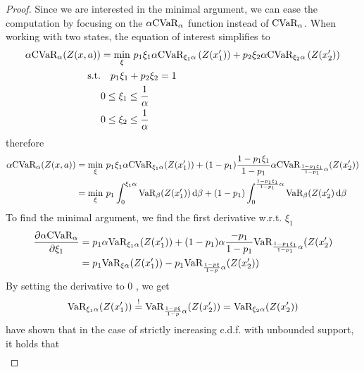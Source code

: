 \begin{proof}
Since we are interested in the minimal argument, we can ease the computation by focusing on the $\alpha\text{CVaR}_\alpha$ function instead of $\text{CVaR}_\alpha$.
When working with two states, the equation of interest simplifies to
\begin{equation*}\label{eqn:cvardecomp2}
\begin{split}
\alpha\text{CVaR}_\alpha(Z(x, a))&=\min_{\xi} \, p_1\xi_1\alpha \text{CVaR}_{\xi_1\alpha}\left(Z(x_1')\right) + p_2\xi_2\alpha\text{CVaR}_{\xi_2\alpha}\left(Z(x_2')\right)\\
\text{s.t.}& \quad p_1\xi_1 + p_2\xi_2 = 1\\
& 0 \le \xi_1 \le \frac{1}{\alpha}\\
& 0 \le \xi_2 \le \frac{1}{\alpha}
\end{split}
\end{equation*}
therefore
\begin{equation*}\label{eqn:cvardecomp3}
\begin{split}
\alpha\text{CVaR}_\alpha(Z(x, a))&=\min_{\xi} \, p_1\xi_1\alpha \text{CVaR}_{\xi_1\alpha}(Z(x_1')) + (1-p_1)\dfrac{1-p_1\xi_1}{1-p_1}\alpha\text{CVaR}_{\frac{1-p_1\xi_1}{1-p_1}\alpha}(Z(x_2'))\\
&=\min_{\xi} \, p_1\int_0^{\xi_1\alpha}\text{VaR}_{\beta}(Z(x_1'))\,\text{d}\beta + (1-p_1)\int_0^{\frac{1-p_1\xi_1}{1-p_1}\alpha}\text{VaR}_{\beta}(Z(x_2')\,\text{d}\beta\\
\end{split}
\end{equation*}
To find the minimal argument, we find the first derivative w.r.t. $\xi_1$
\begin{equation*}
\begin{split}
\dfrac{\partial \alpha\text{CVaR}_\alpha}{\partial \xi_1} &= p_1\alpha \text{VaR}_{\xi_1\alpha}(Z(x_1')) + (1-p_1)\alpha\dfrac{-p_1}{1-p_1}\text{VaR}_{\frac{1-p_1\xi_1}{1-p_1}\alpha}(Z(x_2')\\
&= p_1\text{VaR}_{\xi\alpha}(Z(x_1')) - p_1\text{VaR}_{\frac{1-p\xi}{1-p}\alpha}(Z(x_2'))
\end{split}
\end{equation*}
By setting the derivative to 0 , we get
\begin{equation*}
\text{VaR}_{\xi_1\alpha}(Z(x_1')) \overset{!}{=} \text{VaR}_{\frac{1-p\xi}{1-p}\alpha}(Z(x_2')) = \text{VaR}_{\xi_2\alpha}(Z(x_2'))
\end{equation*}
\citet{bernard2015quantile} have shown that in the case of strictly increasing c.d.f. with unbounded support, it holds that
\begin{equation*}
\begin{split}

\end{split}
\end{equation*}
\end{proof}

